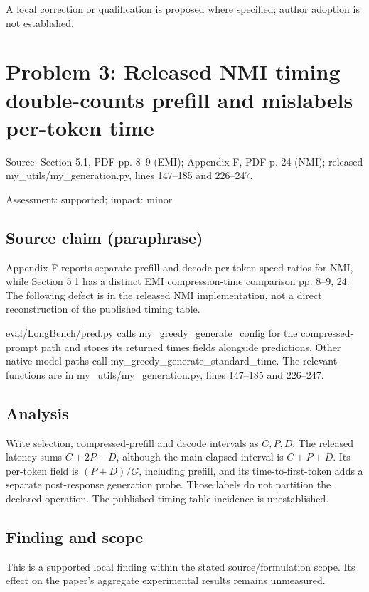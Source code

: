 \documentclass[11pt]{article}
\begin{document}
A local correction or qualification is proposed where specified; author adoption is not established.

\section*{Problem 3: Released NMI timing double-counts prefill and mislabels per-token time}

Source: Section 5.1, PDF pp. 8–9 (EMI); Appendix F, PDF p. 24 (NMI); released my\_utils/my\_generation.py, lines 147–185 and 226–247.

Assessment: supported; impact: minor

\subsection*{Source claim (paraphrase)}

Appendix F reports separate prefill and decode-per-token speed ratios for NMI, while Section 5.1 has a distinct EMI compression-time comparison pp. 8–9, 24. The following defect is in the released NMI implementation, not a direct reconstruction of the published timing table.

eval/LongBench/pred.py calls my\_greedy\_generate\_config for the compressed-prompt path and stores its returned times fields alongside predictions. Other native-model paths call my\_greedy\_generate\_standard\_time. The relevant functions are in my\_utils/my\_generation.py, lines 147–185 and \(226\)–247.

\subsection*{Analysis}

Write selection, compressed-prefill and decode intervals as \(C,P,D\). The released latency sums \(C+2P+D\), although the main elapsed interval is \(C+P+D\). Its per-token field is \((P+D)/G\), including prefill, and its time-to-first-token adds a separate post-response generation probe. Those labels do not partition the declared operation. The published timing-table incidence is unestablished.

\subsection*{Finding and scope}

This is a supported local finding within the stated source/formulation scope. Its effect on the paper's aggregate experimental results remains unmeasured.
\end{document}
